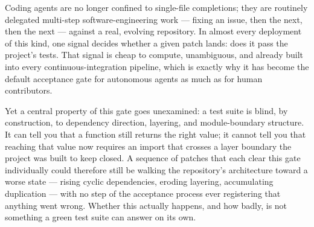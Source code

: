 \documentclass[11pt]{article}
\begin{document}
Coding agents are no longer confined to single-file completions; they are routinely delegated multi-step software-engineering work --- fixing an issue, then the next, then the next --- against a real, evolving repository. In almost every deployment of this kind, one signal decides whether a given patch lands: does it pass the project's tests. That signal is cheap to compute, unambiguous, and already built into every continuous-integration pipeline, which is exactly why it has become the default acceptance gate for autonomous agents as much as for human contributors.

Yet a central property of this gate goes unexamined: a test suite is blind, by construction, to dependency direction, layering, and module-boundary structure. It can tell you that a function still returns the right value; it cannot tell you that reaching that value now requires an import that crosses a layer boundary the project was built to keep closed. A sequence of patches that each clear this gate individually could therefore still be walking the repository's architecture toward a worse state --- rising cyclic dependencies, eroding layering, accumulating duplication --- with no step of the acceptance process ever registering that anything went wrong. Whether this actually happens, and how badly, is not something a green test suite can answer on its own.
\end{document}
